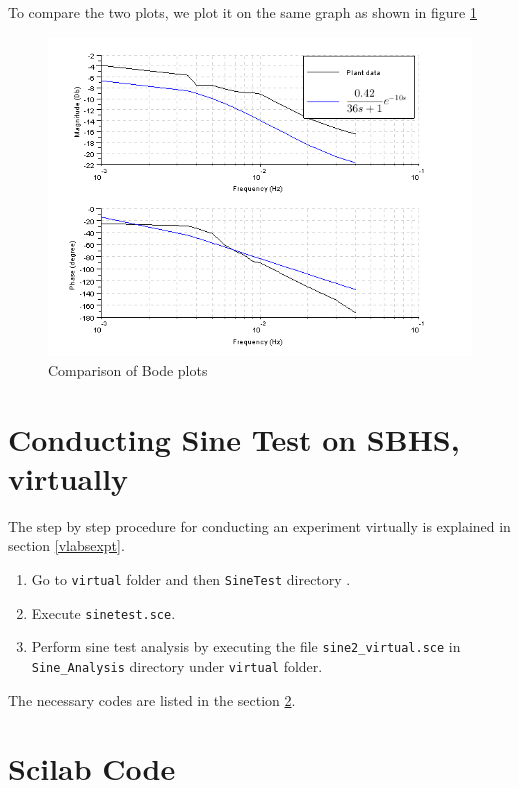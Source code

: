 To compare the two plots, we plot it on the same graph as shown in figure \ref{compare_bode}
\begin{figure}
\centering
\includegraphics[width=\linewidth]{sinetest_manual/bode_comparison}
\caption{Comparison of Bode plots}
\label{compare_bode}
\end{figure}


\section{Conducting Sine Test on SBHS, virtually}
The step by step procedure for conducting an experiment virtually is explained in section \ref{vlabsexpt}. 
\begin{enumerate}
 \item Go to {\tt virtual} folder and then {\tt SineTest} directory .
 \item Execute {\tt sinetest.sce}.
 \item Perform sine test analysis by executing the file {\tt sine2\_virtual.sce} in {\tt Sine\_Analysis} directory 
 under {\tt virtual} folder.
\end{enumerate}
The necessary codes are listed in the section \ref{sinecodes}.


\section{Scilab Code}\label{sinecodes}

\begin{code}

\end{code}


